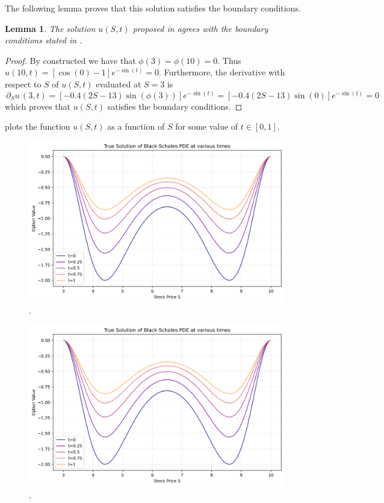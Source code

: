 \documentclass{article}
\newtheorem{lemma}[thm]{Lemma}
\newcommand{\darg}[2]{\ensuremath{\, \partial_{#2}#1} \, }
\newcommand{\dS}[1]{\ensuremath{\darg{#1}{S}}}
\newcommand{\dSu}{\dS{u}}
\begin{document}
The following lemma proves that this solution satisfies the boundary conditions.
\begin{lemma}
    The solution $u(S,t)$ proposed in  agrees with the boundary conditions stated in .
\end{lemma}
\begin{proof}
    By constructed we have that $\phi(3)=\phi(10)=0$. Thus $u(10,t)=\left[\cos\left(0\right)-1\right]e^{-\sin(t)} = 0$. Furthermore, the derivative with respect to $S$ of $u(S,t)$ evaluated at $S = 3$ is
    \begin{equation*}
        \dSu(3, t) = \left[-0.4 (2S - 13) \sin(\phi(3))\right]e^{-\sin (t)} = \left[-0.4 (2S - 13) \sin(0)\right]e^{-\sin (t)} = 0
    \end{equation*}
    which proves that $u(S,t)$ satisfies the boundary conditions.
\end{proof}
 plots the function $u(S,t)$ as a function of $S$ for some value of $t \in [0,1]$.

\begin{figure}[!ht]
    \centering
    \includegraphics[width=0.75\linewidth]{code/images/true_constructed_cos.png}
    \caption{.}
    \label{fig:plot_cos}
\end{figure}

\begin{figure}[!ht]
    \centering
    \includegraphics[width=0.75\linewidth]{code/images/true_constructed_cos.png}
    \caption{.}
    \label{fig:plot_cos}
\end{figure}
\end{document}
